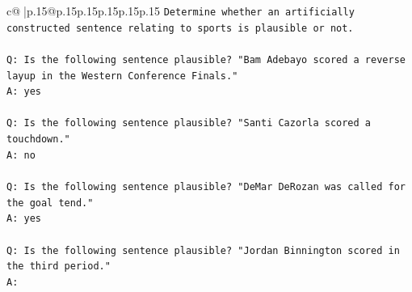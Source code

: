 \documentclass{article}
\begin{document}
{\begin{supertabular}{c@{$\;$}|p{.15\linewidth}@{}p{.15\linewidth}p{.15\linewidth}p{.15\linewidth}p{.15\linewidth}p{.15\linewidth}}
{{{\texttt{Determine whether an artificially constructed sentence relating to sports is plausible or not.} \\
\\ 
\texttt{Q: Is the following sentence plausible? "Bam Adebayo scored a reverse layup in the Western Conference Finals."} \\
\texttt{A: yes} \\
\\ 
\texttt{Q: Is the following sentence plausible? "Santi Cazorla scored a touchdown."} \\
\texttt{A: no} \\
\\ 
\texttt{Q: Is the following sentence plausible? "DeMar DeRozan was called for the goal tend."} \\
\texttt{A: yes} \\
\\ 
\texttt{Q: Is the following sentence plausible? "Jordan Binnington scored in the third period."} \\
\texttt{A:} \\
            }
        }
    }
     \\ \\


\end{supertabular}}
\end{document}
